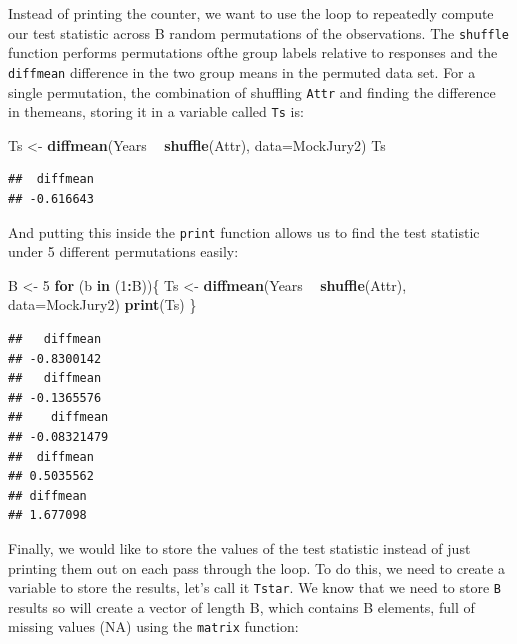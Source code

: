 \documentclass[]{book}
\newenvironment{Shaded}{\begin{snugshade}}{\end{snugshade}}
\newcommand{\KeywordTok}[1]{\textcolor[rgb]{0.13,0.29,0.53}{\textbf{#1}}}
\newcommand{\DataTypeTok}[1]{\textcolor[rgb]{0.13,0.29,0.53}{#1}}
\newcommand{\DecValTok}[1]{\textcolor[rgb]{0.00,0.00,0.81}{#1}}
\newcommand{\StringTok}[1]{\textcolor[rgb]{0.31,0.60,0.02}{#1}}
\newcommand{\ControlFlowTok}[1]{\textcolor[rgb]{0.13,0.29,0.53}{\textbf{#1}}}
\newcommand{\OperatorTok}[1]{\textcolor[rgb]{0.81,0.36,0.00}{\textbf{#1}}}
\newcommand{\NormalTok}[1]{#1}
\begin{document}
Instead of printing the counter, we want to use the loop to repeatedly
compute our test statistic across B random permutations of the
observations. The \texttt{shuffle} function performs permutations ofthe
group labels relative to responses and the \texttt{diffmean} difference
in the two group means in the permuted data set. For a single
permutation, the combination of shuffling \texttt{Attr} and finding the
difference in themeans, storing it in a variable called \texttt{Ts} is:

\begin{Shaded}
\begin{Highlighting}[]
\NormalTok{Ts <-}\StringTok{ }\KeywordTok{diffmean}\NormalTok{(Years }\OperatorTok{~}\StringTok{ }\KeywordTok{shuffle}\NormalTok{(Attr), }\DataTypeTok{data=}\NormalTok{MockJury2)}
\NormalTok{Ts}
\end{Highlighting}
\end{Shaded}

\begin{verbatim}
##  diffmean 
## -0.616643
\end{verbatim}

And putting this inside the \texttt{print} function allows us to find
the test statistic under 5 different permutations easily:

\begin{Shaded}
\begin{Highlighting}[]
\NormalTok{B <-}\StringTok{ }\DecValTok{5}
\ControlFlowTok{for}\NormalTok{ (b }\ControlFlowTok{in}\NormalTok{ (}\DecValTok{1}\OperatorTok{:}\NormalTok{B))\{}
\NormalTok{  Ts <-}\StringTok{ }\KeywordTok{diffmean}\NormalTok{(Years }\OperatorTok{~}\StringTok{ }\KeywordTok{shuffle}\NormalTok{(Attr), }\DataTypeTok{data=}\NormalTok{MockJury2)}
  \KeywordTok{print}\NormalTok{(Ts)}
\NormalTok{\}}
\end{Highlighting}
\end{Shaded}

\begin{verbatim}
##   diffmean 
## -0.8300142 
##   diffmean 
## -0.1365576 
##    diffmean 
## -0.08321479 
##  diffmean 
## 0.5035562 
## diffmean 
## 1.677098
\end{verbatim}

Finally, we would like to store the values of the test statistic instead
of just printing them out on each pass through the loop. To do this, we
need to create a variable to store the results, let's call it
\texttt{Tstar}. We know that we need to store \texttt{B} results so will
create a vector of length B, which contains B elements, full of missing
values (NA) using the \texttt{matrix} function:
\end{document}
